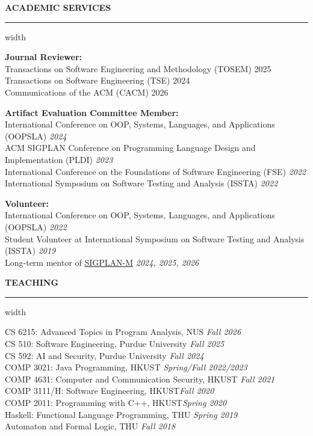 \documentclass[centered]{resume}
\newlength{\cvsectiongap}
\newenvironment{rSection}[1]{%
  \par\Needspace{5\baselineskip}\addvspace{\cvsectiongap}
  {\bfseries \MakeUppercase{#1}}\vspace{0.65em}%
  \noindent\hrule width \linewidth\vspace{-0.45em}\par
}{\par}
\begin{document}
\begin{resume}
\begin{rSection}{Academic Services}
\textbf{Journal Reviewer:} \\
{Transactions on Software Engineering and Methodology (TOSEM)} \hfill 2025\\
{Transactions on Software Engineering (TSE)} \hfill 2024 \\
{Communications of the ACM (CACM)} \hfill 2026 \\

\vspace{-2mm}

\textbf{Artifact Evaluation Committee Member:} \\
{International Conference on OOP, Systems, Languages, and Applications (OOPSLA)} \hfill {\em 2024} \\
{ACM SIGPLAN Conference on Programming Language Design and Implementation (PLDI)} \hfill {\em 2023} \\
{International Conference on the Foundations of Software Engineering (FSE)} \hfill {\em 2022} \\
{International Symposium on Software Testing and Analysis (ISSTA)} \hfill {\em 2022} 


\textbf{Volunteer:} \\
{International Conference on OOP, Systems, Languages, and Applications (OOPSLA)} \hfill {\em 2022} \\
{Student Volunteer at International Symposium on Software Testing and Analysis (ISSTA)} \hfill {\em 2019} \\
Long-term mentor of \href{https://www.sigplan.org/LongTermMentoring/}{SIGPLAN-M} \hfill {\em 2024, 2025, 2026} \\
\end{rSection}

\vspace{-3mm}





\begin{rSection}{Teaching} 
{CS 6215: Advanced Topics in Program Analysis, NUS} \hfill {\em Fall 2026}\\
{CS 510: Software Engineering, Purdue University} \hfill {\em Fall 2025}\\
{CS 592: AI and Security, Purdue University} \hfill {\em Fall 2024}\\
{COMP 3021: Java Programming, HKUST} \hfill {\em Spring/Fall 2022/2023} \\
{COMP 4631: Computer and Communication Security, HKUST} \hfill {\em Fall 2021} \\
{COMP 3111/H: Software Engineering, HKUST}\hfill {\em Fall 2020} \\
{COMP 2011: Programming with C++, HKUST}\hfill {\em Spring 2020} \\
{Haskell: Functional Language Programming, THU} \hfill {\em Spring 2019} \\
{Automaton and Formal Logic, THU} \hfill {\em Fall 2018} \\
\end{rSection}


\end{resume}
\end{document}
